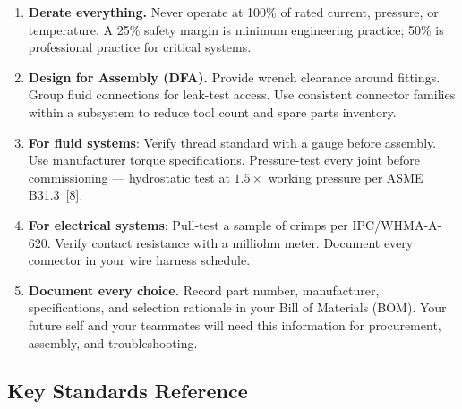 \documentclass[11pt,letterpaper,twoside,openany]{book}
\begin{document}
\begin{enumerate}[leftmargin=1.5em]
  \item \textbf{Derate everything.} Never operate at 100\% of rated current, pressure, or temperature. A 25\% safety margin is minimum engineering practice; 50\% is professional practice for critical systems.

  \item \textbf{Design for Assembly (DFA).} Provide wrench clearance around fittings. Group fluid connections for leak-test access. Use consistent connector families within a subsystem to reduce tool count and spare parts inventory.

  \item \textbf{For fluid systems}: Verify thread standard with a gauge before assembly. Use manufacturer torque specifications. Pressure-test every joint before commissioning --- hydrostatic test at $1.5\times$ working pressure per ASME B31.3~[8].

  \item \textbf{For electrical systems}: Pull-test a sample of crimps per IPC/WHMA-A-620. Verify contact resistance with a milliohm meter. Document every connector in your wire harness schedule.

  \item \textbf{Document every choice.} Record part number, manufacturer, specifications, and selection rationale in your Bill of Materials (BOM). Your future self and your teammates will need this information for procurement, assembly, and troubleshooting.
\end{enumerate}


\subsection{Key Standards Reference}
\end{document}
